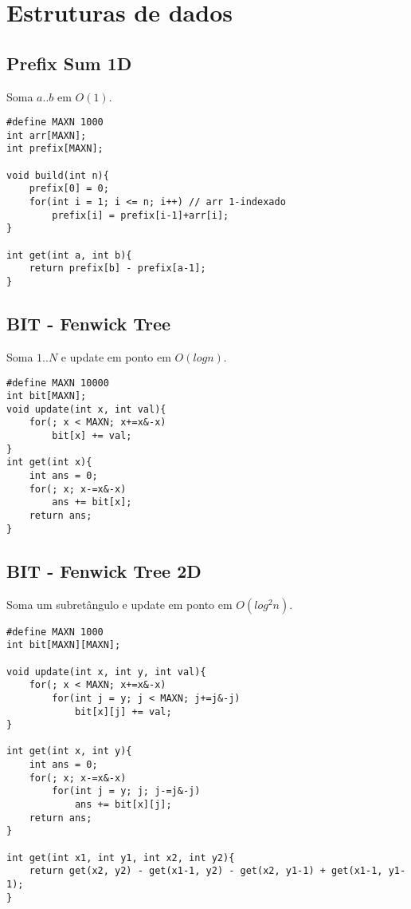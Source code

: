 \chapter{Estruturas de dados}

\section{Prefix Sum 1D}

Soma $a..b$ em $O(1)$.
\begin{multicols}{2}
\begin{lstlisting}
#define MAXN 1000
int arr[MAXN];
int prefix[MAXN];

void build(int n){
	prefix[0] = 0;
	for(int i = 1; i <= n; i++) // arr 1-indexado
		prefix[i] = prefix[i-1]+arr[i];
}

int get(int a, int b){
	return prefix[b] - prefix[a-1];
}

\end{lstlisting}
\end{multicols}


\section{BIT - Fenwick Tree}

Soma $1..N$ e update em ponto em $O(log n)$.
\begin{multicols}{2}
	\begin{lstlisting}
#define MAXN 10000
int bit[MAXN];
void update(int x, int val){
	for(; x < MAXN; x+=x&-x)
		bit[x] += val;
}
int get(int x){
	int ans = 0;
	for(; x; x-=x&-x)
		ans += bit[x];
	return ans;
}
	\end{lstlisting}
\end{multicols}

\section{BIT - Fenwick Tree 2D}

Soma um subretângulo e update em ponto em $O(log^2n)$.
\begin{multicols}{2}
	\begin{lstlisting}
#define MAXN 1000
int bit[MAXN][MAXN];

void update(int x, int y, int val){
	for(; x < MAXN; x+=x&-x)
		for(int j = y; j < MAXN; j+=j&-j)
			bit[x][j] += val;
}

int get(int x, int y){
	int ans = 0;
	for(; x; x-=x&-x)
		for(int j = y; j; j-=j&-j)
			ans += bit[x][j];
	return ans;
}

int get(int x1, int y1, int x2, int y2){
	return get(x2, y2) - get(x1-1, y2) - get(x2, y1-1) + get(x1-1, y1-1);
}

	\end{lstlisting}
\end{multicols}

